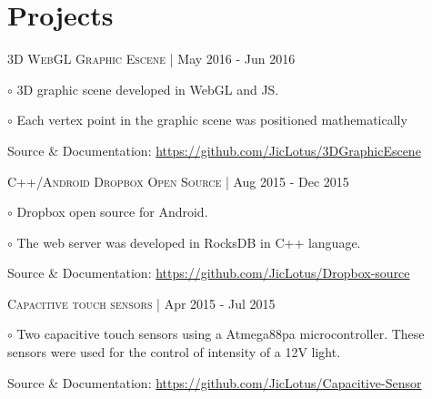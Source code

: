 \documentclass[letterpaper]{article}
\renewenvironment{itemize}{
  \begin{list}{}{
    \setlength{\leftmargin}{1.5em}
  }
}{
  \end{list}
}
\newenvironment{no-indent-itemize}{
  \begin{list}{}{
    \setlength{\leftmargin}{0em}
  }
}{
  \end{list}
}
\def\bullet{$\circ$\xspace}
\begin{document}
\section*{Projects}
\begin{no-indent-itemize}
    
    \item \textsc{3D WebGL Graphic Escene} | May 2016 - Jun 2016
    \begin{itemize}
    \item\bullet 3D graphic scene developed in WebGL and JS.
    \item\bullet Each vertex point in the graphic scene was positioned mathematically
    \end{itemize}
    \begin{itemize}
    \item Source \& Documentation: \href{https://github.com/JicLotus/3DGraphicEscene}{https://github.com/JicLotus/3DGraphicEscene}
    
    \end{itemize}

    \item \textsc{C++/Android Dropbox Open Source} | Aug 2015 - Dec 2015
    \begin{itemize}
        \item\bullet Dropbox open source for Android.
        \item\bullet The web server was developed in RocksDB in C++ language.
        \end{itemize}    
    \begin{itemize}
        \item Source \& Documentation:
        \href{https://github.com/JicLotus/Dropbox-source}{https://github.com/JicLotus/Dropbox-source}
    \end{itemize}

    \item \textsc{Capacitive touch sensors} |  Apr 2015 - Jul 2015

    \begin{itemize}
        \item\bullet Two capacitive touch sensors using a Atmega88pa microcontroller. These sensors were used for the control of intensity of a 12V light.
        
        Source \& Documentation: \href{https://github.com/JicLotus/Capacitive-Sensor}{https://github.com/JicLotus/Capacitive-Sensor}
    \end{itemize}

\end{no-indent-itemize}
\end{document}
